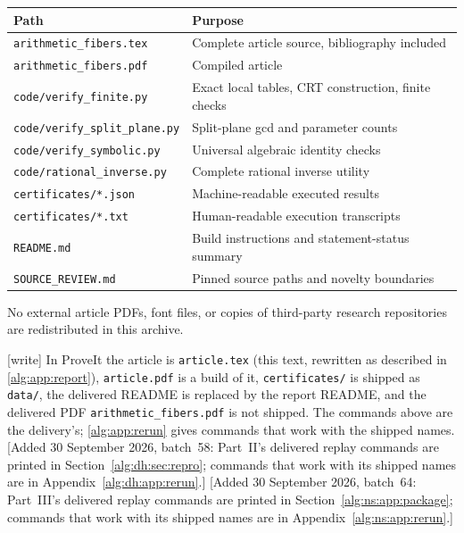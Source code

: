 \documentclass[11pt]{article}
\numberwithin{equation}{section}
\theoremstyle{plain}
\theoremstyle{plain}
\theoremstyle{plain}
\theoremstyle{definition}
\theoremstyle{definition}
\theoremstyle{definition}
\theoremstyle{remark}
\newcommand{\wtag}{\textup{[write]}}%
\newcommand{\rpath}[1]{\nolinkurl{#1}}
\begin{document}
\begin{center}\small
\begin{tabular}{p{}p{}}
\toprule
Path & Purpose\\
\midrule
\texttt{arithmetic\_fibers.tex} & Complete article source, bibliography included\\
\texttt{arithmetic\_fibers.pdf} & Compiled article\\
\texttt{code/verify\_finite.py} & Exact local tables, CRT construction, finite checks\\
\texttt{code/verify\_split\_plane.py} & Split-plane gcd and parameter counts\\
\texttt{code/verify\_symbolic.py} & Universal algebraic identity checks\\
\texttt{code/rational\_inverse.py} & Complete rational inverse utility\\
\texttt{certificates/*.json} & Machine-readable executed results\\
\texttt{certificates/*.txt} & Human-readable execution transcripts\\
\texttt{README.md} & Build instructions and statement-status summary\\
\texttt{SOURCE\_REVIEW.md} & Pinned source paths and novelty boundaries\\
\bottomrule
\end{tabular}
\end{center}
No external article PDFs, font files, or copies of third-party research
repositories are redistributed in this archive.

\wtag{} In ProveIt the article is \rpath{article.tex} (this text, rewritten
as described in \cref{alg:app:report}), \rpath{article.pdf} is a build of
it, \texttt{certificates/} is shipped as \rpath{data/}, the delivered
README is replaced by the report README, and the delivered PDF
\texttt{arithmetic\_fibers.pdf} is not shipped. The commands above are the
delivery's; \cref{alg:app:rerun} gives commands that work with the shipped
names.
[Added 30 September 2026, batch~58: Part~II's delivered replay commands
are printed in Section~\ref{alg:dh:sec:repro}; commands that work with
its shipped names are in Appendix~\ref{alg:dh:app:rerun}.]
[Added 30 September 2026, batch~64: Part~III's delivered replay commands
are printed in Section~\ref{alg:ns:app:package}; commands that work with
its shipped names are in Appendix~\ref{alg:ns:app:rerun}.]
\end{document}
